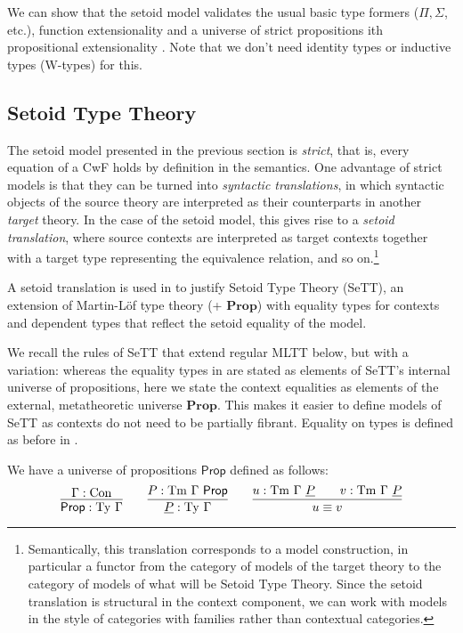 \documentclass[a4paper,UKenglish,cleveref, autoref, thm-restate]{lipics-v2019}
\newcommand{\GG}{\Gamma}
\newcommand{\Prop}{\textsf{Prop}}
\newcommand{\mProp}{\mathbf{Prop}}
\newcommand{\Con}{\mathrm{Con}}
\newcommand{\Ty}{\mathrm{Ty}}
\newcommand{\Tm}{\mathrm{Tm}}
\begin{document}
We can show that the setoid model validates the usual basic type formers ($\Pi,
\Sigma$, etc.), function extensionality and a universe of strict
propositions ith propositional extensionality \cite{setoid99}. Note that
we don't need identity types or inductive types (W-types) for this.

\subsection{Setoid Type Theory}\label{sett}

The setoid model presented in the previous section is \emph{strict}, that is,
every equation of a CwF holds by definition in the semantics. One advantage of
strict models is that they can be turned into \emph{syntactic translations}, in
which syntactic objects of the source theory are interpreted as their
counterparts in another \emph{target} theory. In the case of the setoid model,
this gives rise to a \emph{setoid translation}, where source contexts are
interpreted as target contexts together with a target type representing the
equivalence relation, and so on.\footnote{%
Semantically, this translation corresponds to a model construction, in
particular a functor from the category of models of the target theory to the
category of models of what will be Setoid Type Theory.  Since the setoid
translation is structural in the context component, we can work with models in
the style of categories with families rather than contextual categories.
}

A setoid translation is used in \cite{mpc19} to justify Setoid Type Theory
(SeTT), an extension of Martin-L\"of type theory (+ $\mProp$) with equality
types for contexts and dependent types that reflect the setoid equality of the
model.

We recall the rules of SeTT that extend regular MLTT below, but with a
variation: whereas the equality types in \cite{mpc19} are stated as elements of
SeTT's internal universe of propositions, here we state the context equalities
as elements of the external, metatheoretic universe $\mProp$. This makes it easier
to define models of SeTT as contexts do not need to be partially fibrant. Equality on
types is defined as before in \cite{mpc19}.

We have a universe of propositions $\Prop$ defined as follows:
\[
\infer{
  \Prop : \Ty\ \GG
}{
  \GG : \Con
}
\qquad
\infer{
  \underline{P} : \Ty\ \GG
}{
  P : \Tm\ \GG\ \Prop
}
\qquad
\infer{
  u \equiv v\vphantom{\Prop}
}{
  u : \Tm\ \GG\ \underline{P} && v : \Tm\ \GG\ \underline{P}
}
\]
\end{document}
